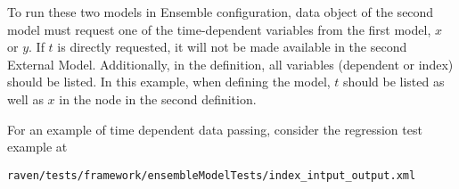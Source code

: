 To run these two models in Ensemble configuration,  data object of the second model
must request one of the time-dependent variables from the first model, $x$ or $y$.  If $t$ is directly
requested, it will not be made available in the second External Model.  Additionally, in the 
definition, all variables (dependent or index) should be listed.  In this example, when defining the model,
$t$ should be listed as well as $x$ in the  node in the second  definition.

For an example of time dependent data passing, consider the regression test example at
\begin{verbatim}
raven/tests/framework/ensembleModelTests/index_intput_output.xml
\end{verbatim}

